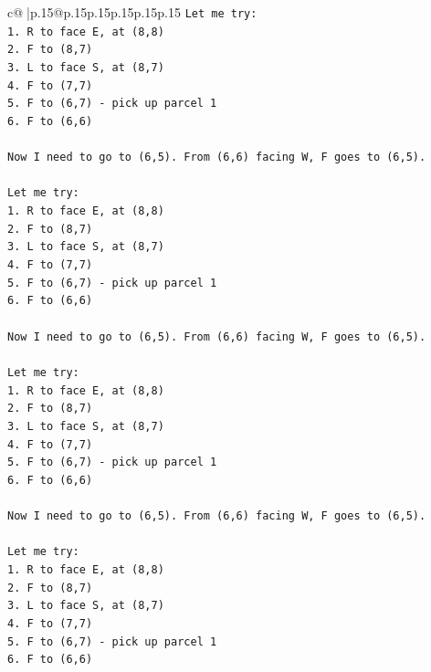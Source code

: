 \documentclass{article}
\begin{document}
{\begin{supertabular}{c@{$\;$}|p{.15\linewidth}@{}p{.15\linewidth}p{.15\linewidth}p{.15\linewidth}p{.15\linewidth}p{.15\linewidth}}
{{{\texttt{Let me try:} \\
\texttt{1. R to face E, at (8,8)} \\
\texttt{2. F to (8,7)} \\
\texttt{3. L to face S, at (8,7)} \\
\texttt{4. F to (7,7)} \\
\texttt{5. F to (6,7) {-} pick up parcel 1} \\
\texttt{6. F to (6,6)} \\
\\ 
\texttt{Now I need to go to (6,5). From (6,6) facing W, F goes to (6,5).} \\
\\ 
\texttt{Let me try:} \\
\texttt{1. R to face E, at (8,8)} \\
\texttt{2. F to (8,7)} \\
\texttt{3. L to face S, at (8,7)} \\
\texttt{4. F to (7,7)} \\
\texttt{5. F to (6,7) {-} pick up parcel 1} \\
\texttt{6. F to (6,6)} \\
\\ 
\texttt{Now I need to go to (6,5). From (6,6) facing W, F goes to (6,5).} \\
\\ 
\texttt{Let me try:} \\
\texttt{1. R to face E, at (8,8)} \\
\texttt{2. F to (8,7)} \\
\texttt{3. L to face S, at (8,7)} \\
\texttt{4. F to (7,7)} \\
\texttt{5. F to (6,7) {-} pick up parcel 1} \\
\texttt{6. F to (6,6)} \\
\\ 
\texttt{Now I need to go to (6,5). From (6,6) facing W, F goes to (6,5).} \\
\\ 
\texttt{Let me try:} \\
\texttt{1. R to face E, at (8,8)} \\
\texttt{2. F to (8,7)} \\
\texttt{3. L to face S, at (8,7)} \\
\texttt{4. F to (7,7)} \\
\texttt{5. F to (6,7) {-} pick up parcel 1} \\
\texttt{6. F to (6,6)} \\
}}}
\end{supertabular}}
\end{document}

